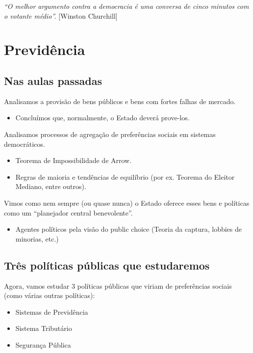 \documentclass[a4paper,12pt]{article}[abntex2]
\begin{document}
\textit{“O melhor argumento contra a democracia é uma conversa de cinco minutos com o votante médio”.} [Winston Churchill]

\newpage
\section{\textbf{Previdência}}
\subsection{\textbf{Nas aulas passadas}}
Analisamos a provisão de bens públicos e bens com fortes falhas de mercado.\begin{itemize}
    \item Concluímos que, normalmente, o Estado deverá prove-los.
\end{itemize}

 Analisamos processos de agregação de preferências sociais em sistemas democráticos.\begin{itemize}
    \item Teorema de Impossibilidade de Arrow.
    \item Regras de maioria e tendências de equilíbrio (por ex. Teorema do Eleitor Mediano, entre outros). 
\end{itemize}

 Vimos como nem sempre (ou quase nunca) o Estado oferece esses bens e políticas como um “planejador central benevolente”. \begin{itemize}
    \item Agentes políticos pela visão do public choice (Teoria da captura, lobbies de minorias, etc.)
\end{itemize}

\subsection{\textbf{Três políticas públicas que estudaremos}}
Agora, vamos estudar 3 políticas públicas que viriam de preferências sociais (como várias outras políticas):\begin{itemize}
    \item Sistemas de Previdência
    \item Sistema Tributário
    \item Segurança Pública
\end{itemize}
\end{document}
